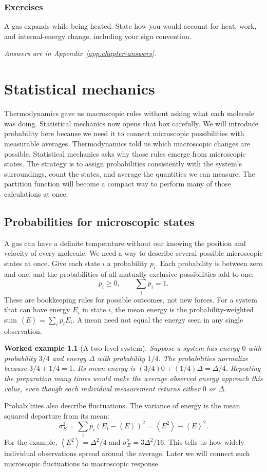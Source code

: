 \documentclass[11pt,oneside]{book}
\newcommand{\avg}[1]{\left\langle #1\right\rangle}
\theoremstyle{reviewstyle}
\newtheorem{example}{Worked example}[chapter]
\newcommand{\learningcheck}[1]{\subsection*{Exercises}\noindent #1\par\smallskip\noindent\emph{Answers are in Appendix~\ref{app:chapter-answers}.}}
\begin{document}
\learningcheck{A gas expands while being heated. State how you would account for heat, work, and internal-energy change, including your sign convention.}

\chapter{Statistical mechanics}
Thermodynamics gave us macroscopic rules without asking what each molecule was doing. Statistical mechanics now opens that box carefully. We will introduce probability here because we need it to connect microscopic possibilities with measurable averages.
Thermodynamics told us which macroscopic changes are possible. Statistical mechanics asks why those rules emerge from microscopic states. The strategy is to assign probabilities consistently with the system's surroundings, count the states, and average the quantities we can measure. The partition function will become a compact way to perform many of those calculations at once.

\section{Probabilities for microscopic states}
A gas can have a definite temperature without our knowing the position and velocity of every molecule. We need a way to describe several possible microscopic states at once. Give each state $i$ a probability $p_i$. Each probability is between zero and one, and the probabilities of all mutually exclusive possibilities add to one:
\begin{equation}
p_i\geq0,\qquad \sum_i p_i=1.
\end{equation}
These are bookkeeping rules for possible outcomes, not new forces. For a system that can have energy $E_i$ in state $i$, the mean energy is the probability-weighted sum $\avg E=\sum_i p_iE_i$. A mean need not equal the energy seen in any single observation.

\begin{example}[A two-level system]
Suppose a system has energy $0$ with probability $3/4$ and energy $\Delta$ with probability $1/4$. The probabilities normalize because $3/4+1/4=1$. Its mean energy is $(3/4)0+(1/4)\Delta=\Delta/4$. Repeating the preparation many times would make the average observed energy approach this value, even though each individual measurement returns either $0$ or $\Delta$.
\end{example}

Probabilities also describe fluctuations. The variance of energy is the mean squared departure from its mean:
\begin{equation}
\sigma_E^2=\sum_i p_i(E_i-\avg E)^2
=\avg{E^2}-\avg E^2.
\end{equation}
For the example, $\avg{E^2}=\Delta^2/4$ and $\sigma_E^2=3\Delta^2/16$. This tells us how widely individual observations spread around the average. Later we will connect such microscopic fluctuations to macroscopic response.
\end{document}
